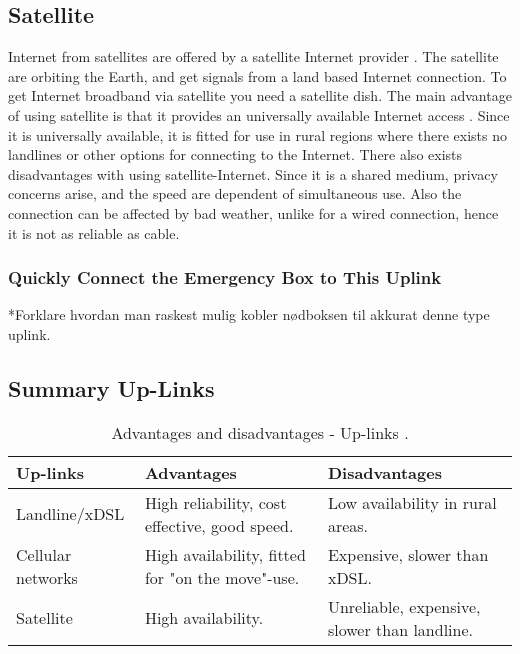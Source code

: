 \subsection{Satellite}
Internet from satellites are offered by a satellite Internet provider \cite{cablevssatellite}. The satellite are orbiting the Earth, and get signals from a land based Internet connection. To get Internet broadband via satellite you need a satellite dish. The main advantage of using satellite is that it provides an universally available Internet access \cite{broadband}. Since it is universally available, it is fitted for use in rural regions where there exists no landlines or other options for connecting to the Internet. There also exists disadvantages with using satellite-Internet. Since it is a shared medium, privacy concerns arise, and the speed are dependent of simultaneous use. Also the connection can be affected by bad weather, unlike for a wired connection, hence it is not as reliable as cable. 

\subsubsection{Quickly Connect the Emergency Box to This Uplink}
*Forklare hvordan man raskest mulig kobler nødboksen til akkurat denne type uplink.

\subsection{Summary Up-Links}

\begin{center}
\begin{table}[!h]
\caption{\label{tab:uplinks}Advantages and disadvantages - Up-links \cite{comparisonuplinks}.}
    \begin{tabular}{ | l | p{4cm} | p{5cm} |}
    \hline
    \textbf{Up-links} & \textbf{Advantages} & \textbf{Disadvantages} \\ 
    \hline
    Landline/xDSL & High reliability, cost effective, good speed. & Low availability in rural areas. \\ 
    \hline
     Cellular networks & High availability, fitted for "on the move"-use. & Expensive, slower than xDSL.\\
    \hline
    Satellite & High availability.  & Unreliable, expensive, slower than landline.\\ 
    \hline
    \end{tabular}
   \end{table}
\end{center}

